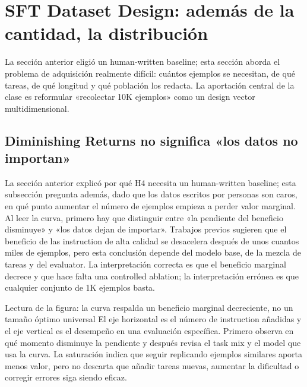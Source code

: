 \section{SFT Dataset Design: además de la cantidad, la distribución}

La sección anterior eligió un human-written baseline; esta sección aborda el problema de adquisición realmente difícil: cuántos ejemplos se necesitan, de qué tareas, de qué longitud y qué población los redacta. La aportación central de la clase es reformular «recolectar 10K ejemplos» como un design vector multidimensional.

\subsection{Diminishing Returns no significa «los datos no importan»}

La sección anterior explicó por qué H4 necesita un human-written baseline; esta subsección pregunta además, dado que los datos escritos por personas son caros, en qué punto aumentar el número de ejemplos empieza a perder valor marginal. Al leer la curva, primero hay que distinguir entre «la pendiente del beneficio disminuye» y «los datos dejan de importar». Trabajos previos sugieren que el beneficio de las instruction de alta calidad se desacelera después de unos cuantos miles de ejemplos, pero esta conclusión depende del modelo base, de la mezcla de tareas y del evaluator. La interpretación correcta es que el beneficio marginal decrece y que hace falta una controlled ablation; la interpretación errónea es que cualquier conjunto de 1K ejemplos basta.


\begin{knowledgebox}{Lectura de la figura: la curva respalda un beneficio marginal decreciente, no un tamaño óptimo universal}
El eje horizontal es el número de instruction añadidas y el eje vertical es el desempeño en una evaluación específica. Primero observa en qué momento disminuye la pendiente y después revisa el task mix y el model que usa la curva. La saturación indica que seguir replicando ejemplos similares aporta menos valor, pero no descarta que añadir tareas nuevas, aumentar la dificultad o corregir errores siga siendo eficaz.
\end{knowledgebox}


